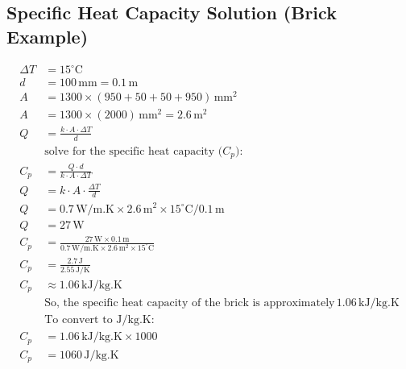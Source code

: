 \begin{theappendices}
\chapter{Specific Heat Capacity Solution (Brick Example)}
\begin{equation}
\begin{aligned}
\Delta T &= 15^\circ \text{C} \\
d &= 100 \, \text{mm} = 0.1 \, \text{m} \\
A &= 1300 \times (950 + 50 + 50 + 950) \, \text{mm}^2 \\
A &= 1300 \times (2000) \, \text{mm}^2 = 2.6 \, \text{m}^2 \\
Q &= \frac{k \cdot A \cdot \Delta T}{d} \\
&\text{solve for the specific heat capacity ($C_p$):} \\
C_p &= \frac{Q \cdot d}{k \cdot A \cdot \Delta T} \\
Q &= k \cdot A \cdot \frac{\Delta T}{d} \\
Q &= 0.7 \, \text{W/m.K} \times 2.6 \, \text{m}^2 \times 15^\circ \text{C} / 0.1 \, \text{m} \\
Q &= 27 \, \text{W} \\
C_p &= \frac{27 \, \text{W} \times 0.1 \, \text{m}}{0.7 \, \text{W/m.K} \times 2.6 \, \text{m}^2 \times 15^\circ \text{C}} \\
C_p &= \frac{2.7 \, \text{J}}{2.55 \, \text{J/K}} \\
C_p &\approx 1.06 \, \text{kJ/kg.K} \\
&\text{So, the specific heat capacity of the brick is approximately} \, 1.06 \, \text{kJ/kg.K} \\
&\text{To convert to J/kg.K:} \\
C_p &= 1.06 \, \text{kJ/kg.K} \times 1000 \\
C_p &= 1060 \, \text{J/kg.K}
\end{aligned}
\label{appendcp}
\end{equation}



































\end{theappendices}